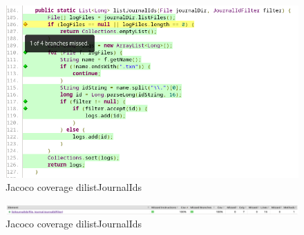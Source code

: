 \documentclass[12pt, a4paper]{article}
\begin{document}
  \begin{figure}
    \includegraphics[width=\linewidth]{MissedBranchListJournalIds.png}
    \caption{Jacoco coverage dilistJournalIds}
    \label{fig:listJournalIdsCFG}
  \end{figure}

  \begin{figure}
    \includegraphics[width=\linewidth]{JacocoCoveragelistJournalIds2.png}
    \caption{Jacoco coverage dilistJournalIds}
    \label{fig:listJournalIdsCFG}
  \end{figure}
\end{document}
